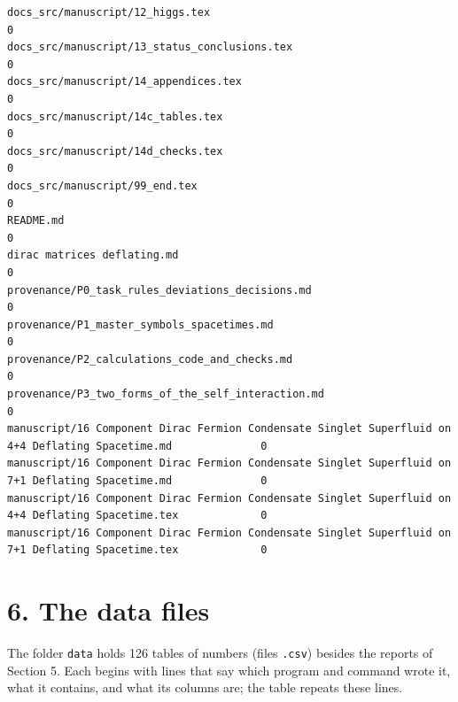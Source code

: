 \documentclass[
  10pt,
]{article}
\begin{document}
\begin{verbatim}
docs_src/manuscript/12_higgs.tex                                                                               0
docs_src/manuscript/13_status_conclusions.tex                                                                  0
docs_src/manuscript/14_appendices.tex                                                                          0
docs_src/manuscript/14c_tables.tex                                                                             0
docs_src/manuscript/14d_checks.tex                                                                             0
docs_src/manuscript/99_end.tex                                                                                 0
README.md                                                                                                      0
dirac matrices deflating.md                                                                                    0
provenance/P0_task_rules_deviations_decisions.md                                                               0
provenance/P1_master_symbols_spacetimes.md                                                                     0
provenance/P2_calculations_code_and_checks.md                                                                  0
provenance/P3_two_forms_of_the_self_interaction.md                                                             0
manuscript/16 Component Dirac Fermion Condensate Singlet Superfluid on 4+4 Deflating Spacetime.md              0
manuscript/16 Component Dirac Fermion Condensate Singlet Superfluid on 7+1 Deflating Spacetime.md              0
manuscript/16 Component Dirac Fermion Condensate Singlet Superfluid on 4+4 Deflating Spacetime.tex             0
manuscript/16 Component Dirac Fermion Condensate Singlet Superfluid on 7+1 Deflating Spacetime.tex             0
\end{verbatim}

\hypertarget{the-data-files}{%
\section{6. The data files}\label{the-data-files}}

The folder \texttt{data} holds 126 tables of numbers (files
\texttt{.csv}) besides the reports of Section 5. Each begins with lines
that say which program and command wrote it, what it contains, and what
its columns are; the table repeats these lines.
\end{document}
